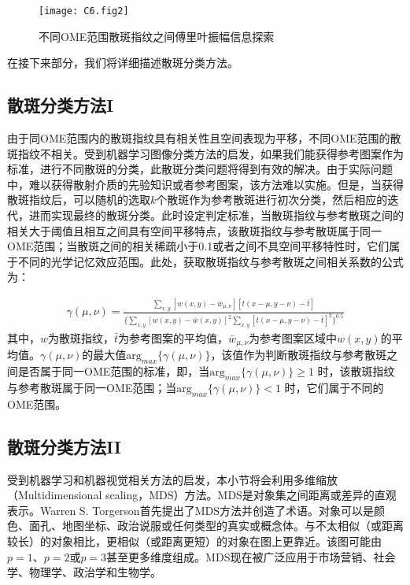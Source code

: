 \begin{figure}[htp]
	\centering
	\texttt{[image: C6.fig2]}
	\caption{不同OME范围散斑指纹之间傅里叶振幅信息探索}
	\label{fig:6.2}
\end{figure}
在接下来部分，我们将详细描述散斑分类方法。

\subsection{散斑分类方法I}

由于同OME范围内的散斑指纹具有相关性且空间表现为平移，不同OME范围的散斑指纹不相关。受到机器学习图像分类方法的启发，如果我们能获得参考图案作为标准，进行不同散斑的分类，此散斑分类问题将得到有效的解决。由于实际问题中，难以获得散射介质的先验知识或者参考图案，该方法难以实施。但是，当获得散斑指纹后，可以随机的选取$k$个散斑作为参考散斑进行初次分类，然后相应的迭代，进而实现最终的散斑分类。此时设定判定标准，当散斑指纹与参考散斑之间的相关大于阈值且相互之间具有空间平移特点，该散斑指纹与参考散斑属于同一OME范围；当散斑之间的相关稀疏小于0.1或者之间不具空间平移特性时，它们属于不同的光学记忆效应范围。此处，获取散斑指纹与参考散斑之间相关系数的公式为：

\begin{equation}
\begin{aligned}
\gamma (\mu,\nu) = \frac{\sum_{x,y} [w(x,y)- \bar{w}_{\mu,\nu}] [t(x-\mu,y-\nu)- \bar{t}]}{\{ \sum_{x,y} [w(x,y)- \bar{w}(x,y)]^2 \sum_{x,y} [t(x-\mu,y-\nu)- \bar{t}]^2  \}^{0.5}}
\label{eq:6.5}
\end{aligned}
\end{equation}
其中，$w$为散斑指纹，$\bar{t}$为参考图案的平均值，$\bar{w}_{\mu,\nu}$为参考图案区域中$w(x,y)$的平均值。$\gamma (\mu,\nu)$的最大值$\mbox{arg}_{max} \{ \gamma (\mu,\nu) \}$，该值作为判断散斑指纹与参考散斑之间是否属于同一OME范围的标准，即，当$\mbox{arg}_{max} \{ \gamma (\mu,\nu) \} \geq 1 $ 时，该散斑指纹与参考散斑属于同一OME范围；当$\mbox{arg}_{max} \{ \gamma (\mu,\nu) \} < 1 $ 时，它们属于不同的OME范围。

\subsection{散斑分类方法II}

受到机器学习和机器视觉相关方法的启发，本小节将会利用多维缩放（Multidimensional scaling，MDS）方法。MDS是对象集之间距离或差异的直观表示。Warren S. Torgerson首先提出了MDS方法并创造了术语\cite{torgerson_multidimensional_1952}。对象可以是颜色、面孔、地图坐标、政治说服或任何类型的真实或概念体。与不太相似（或距离较长）的对象相比，更相似（或距离更短）的对象在图上更靠近。该图可能由 $p = 1$、$p = 2$或$p = 3$甚至更多维度组成。MDS现在被广泛应用于市场营销、社会学、物理学、政治学和生物学\cite{de_leeuw_modern_2005}。

